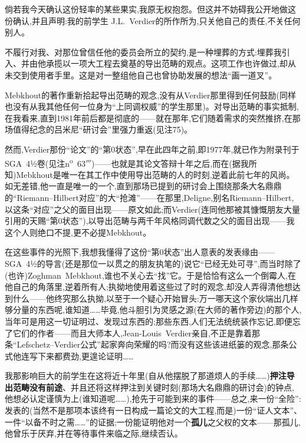 \dmark{}倘若我今天确认这份轻率的某些果实,我原无权抱怨。但这并不妨碍我公开地做这份确认,并且声明:我的前学生 J.L.~Verdier的所作所为,只关他自己的责任,不关任何别人。

不履行对我、对那位曾信任他的委员会所立的契约,是一种埋葬的方式:埋葬我引入、并由他承揽以一项大工程去奠基的导出范畴的观点。这项工作也许做过,却从未交到使用者手里。这是对一整组他自己也曾协助发展的想法“画一道叉”。

Mebkhout的著作重新拾起导出范畴的观念,没有从Verdier那里得到任何鼓励(同样也没有从我其他任何一位身为“上同调权威”的学生那里)。对导出范畴的事实抵制,在我看来,直到1981年前后都是彻底的——就在那年,它们随着需求的突然推挤,在那场值得纪念的吕米尼“研讨会”里强力重返(见注75)。

然而,Verdier那份“论文”的“第0状态”,早在此四年之前,即1977年,就已作为附录刊于SGA~4½卷(见注n\textsuperscript{o}~63$'''$)——也就是其论文答辩十年之后,而在(据我所知)Mebkhout是唯一在其工作中使用导出范畴的人的时刻,逆着此前七年的风尚。如无差错,他一直是唯一的一个,直到那场已提到的研讨会上围绕那条大名鼎鼎的“Riemann--Hilbert对应”的大“抢滩”——在那里,Deligne,别名Riemann--Hilbert,以这条“对应”之父的面目出现——原文如此;而Verdier(连同他那被其慷慨朋友大量引用的天赐“第0状态”),以导出范畴与两千年风格同调代数之父的面目出现——我这个人则绝口不提,更不必提Mebkhout。

\dmark{}在这些事件的光照下,我想我懂得了这份“第0状态”出人意表的发表缘由——SGA~4½的导言(还是那位一以贯之的朋友执笔的)说它“已经无处可寻”,而当时除了(也许)Zoghman~Mebkhout,谁也不关心去“找”它。于是恰恰有这么一个倒霉人,在他自己的角落里,逆着所有人;执拗地使用着这些过了时的观念,却没人弄得清他想达到什么——他终究那么执拗,以至于一个疑心开始冒头:万一哪天这个家伙端出几样够分量的东西呢,谁知道……毕竟,他斗胆引为灵感之源(在大师的著作旁边)的那个人,当年可是用这一切证明过、发现过东西的;那些东西,人们无法统统装作忘记,即便忘了它们的作者——而且大师本人,Jean-Louis~Verdier亲自,不正是靠着那条“Lefschetz--Verdier公式”起家奔向荣耀的吗?而没有这些该进纸篓的观念,那条公式他连写下来都费劲,更遑论证明……

我那影响巨大的前学生在这将近十年里(自从他摆脱了那道烦人的手续……)\textbf{押注导出范畴没有前途}、并且还将这样押注到关键时刻(那场大名鼎鼎的研讨会)的钟点,他想必认定谨慎为上(谁知道呢……),抢先于可能到来的事件——总之,来一份“全险”:发表的(当然不是那项本该终有一日构成一篇论文的大工程,而是)一份“证人文本”、一件“以备不时之需……”的证据;一份能证明他对一个\textbf{孤儿}之父权的文本——那孤儿,他曾乐于厌弃,并在等待事件来临之际,继续否认。

